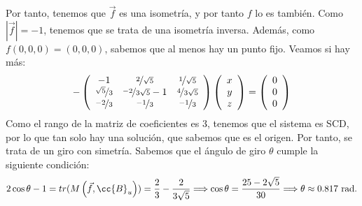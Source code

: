 \begin{ejercicio}
\begin{enumerate}
        Por tanto, tenemos que $\vec{f}$ es una isometría, y por tanto $f$ lo es también. Como $\left|\vec{f}\right|=-1$, tenemos que se trata de una isometría inversa. Además, como $f(0,0,0)=(0,0,0)$, sabemos que al menos hay un punto fijo. Veamos si hay más:
        \begin{equation*}
            -\left(
            \begin{array}{ccc}
                -1 & \nicefrac{2}{\sqrt{5}} & \nicefrac{1}{\sqrt{5}} \\
                \nicefrac{\sqrt{5}}{3} & \nicefrac{-2}{3\sqrt{5}}-1 & \nicefrac{4}{3\sqrt{5}} \\
                \nicefrac{-2}{3} & \nicefrac{-1}{3} & \nicefrac{-1}{3}
            \end{array}
            \right)
            \left(
            \begin{array}{c}
                x \\ y \\ z
            \end{array}
            \right)
            = \left(
            \begin{array}{c}
                0 \\ 0 \\ 0
            \end{array}
            \right)
        \end{equation*}
        Como el rango de la matriz de coeficientes es 3, tenemos que el sistema es SCD, por lo que tan solo hay una solución, que sabemos que es el origen. Por tanto, se trata de un giro con simetría. Sabemos que el ángulo de giro $\theta$ cumple la siguiente condición:
        \begin{equation*}
            2\cos\theta -1 = tr(M\left(\vec{f},\cc{B}_u\right)) = \frac{2}{3} - \frac{2}{3\sqrt{5}} \Longrightarrow \cos\theta = \frac{25 -2\sqrt{5}}{30} \Longrightarrow \theta \approx 0.817\text{ rad}.
        \end{equation*}


\end{enumerate}
\end{ejercicio}
